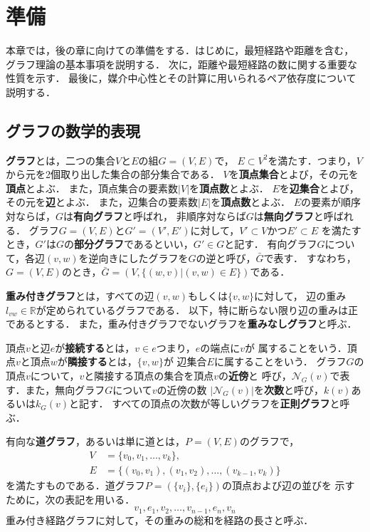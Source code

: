 \chapter{準備}
\label{chap:preliminary}
本章では，後の章に向けての準備をする．はじめに，最短経路や距離を含む，
グラフ理論の基本事項を説明する．
次に，距離や最短経路の数に関する重要な性質を示す．
最後に，媒介中心性とその計算に用いられるペア依存度について説明する．

\section{グラフの数学的表現}
\label{sect:graph-theory}

\textbf{グラフ}とは，二つの集合$V$と$E$の組$G=(V,E)$で，
$E\subset V^2$を満たす．つまり，$V$から元を2個取り出した集合の部分集合である．
$V$を\textbf{頂点集合}とよび，その元を\textbf{頂点}とよぶ．
また，頂点集合の要素数$|V|$を\textbf{頂点数}とよぶ．
$E$を\textbf{辺集合}とよび，その元を\textbf{辺}とよぶ．
また，辺集合の要素数$|E|$を\textbf{頂点数}とよぶ．
$E$の要素が順序対ならば，$G$は\textbf{有向グラフ}と呼ばれ，
非順序対ならば$G$は\textbf{無向グラフ}と呼ばれる．
グラフ$G=(V,E)$と$G'=(V',E')$に対して，$V'\subset V$かつ$E'\subset E$
を満たすとき，$G'$は$G$の\textbf{部分グラフ}であるといい，$G'\in G$と記す．
有向グラフ$G$について，各辺$(v,w)$を逆向きにしたグラフを$G$の逆と呼び，$\bar{G}$で表す．
すなわち，$G=(V,E)$のとき，$\bar{G}=(V,\{(w,v)|(v,w)\in E\})$である．

\textbf{重み付きグラフ}とは，すべての辺$(v,w)$もしくは$\{v,w\}$に対して，
辺の重み$l_{vw}\in\mathbb{R}$が定められているグラフである．
以下，特に断らない限り辺の重みは正であるとする．
また，重み付きグラフでないグラフを\textbf{重みなしグラフ}と呼ぶ．

頂点$v$と辺$e$が\textbf{接続する}とは，$v\in e$つまり，$e$の端点に$v$が
属することをいう．頂点$v$と頂点$w$が\textbf{隣接する}とは，$\{v,w\}$が
辺集合$E$に属することをいう．
グラフ$G$の頂点$v$について，$v$と隣接する頂点の集合を頂点$v$の\textbf{近傍}と
呼び，$\mathcal{N}_G(v)$で表す．また，無向グラフ$G$について$v$の近傍の数
$|\mathcal{N}_G(v)|$を\textbf{次数}と呼び，$k(v)$あるいは$k_G(v)$と記す．
すべての頂点の次数が等しいグラフを\textbf{正則グラフ}と呼ぶ．

有向な\textbf{道グラフ}，あるいは単に道とは，$P=(V,E)$のグラフで，
\begin{equation*}
  \begin{aligned}
  V&=\{v_0,v_1,\ldots,v_k\}, \\
  E&=\{(v_0,v_1),(v_1,v_2),\ldots,(v_{k-1},v_k)\}
  \end{aligned}
\end{equation*}
を満たすものである．道グラフ$P=(\{v_i\},\{e_i\})$の頂点および辺の並びを
示すために，次の表記を用いる．
\[ v_1,e_1,v_2,\ldots,v_{n-1},e_n,v_n \]
重み付き経路グラフに対して，その重みの総和を経路の長さと呼ぶ．

